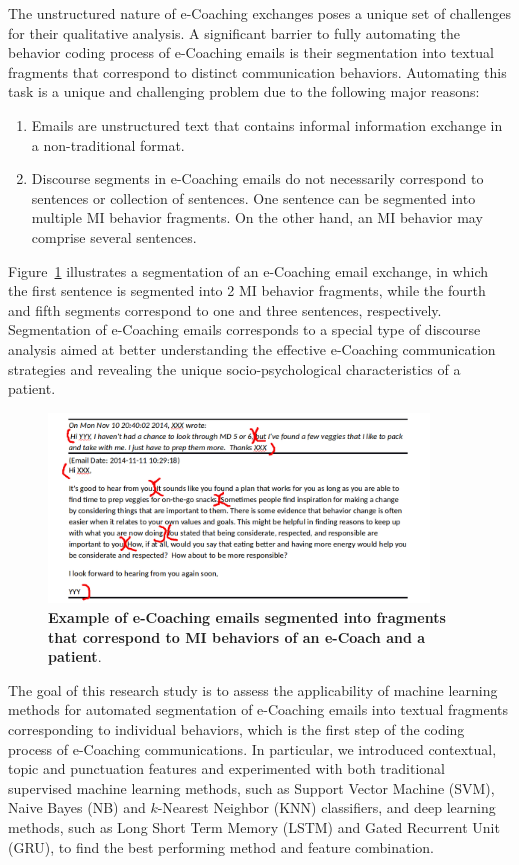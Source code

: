 \documentclass{amia}
\begin{document}
The unstructured nature of e-Coaching exchanges poses a unique set of challenges for their qualitative analysis. A significant barrier to fully automating the behavior coding process of e-Coaching emails is their segmentation into textual fragments that correspond to distinct communication behaviors. Automating this task is a unique and challenging problem due to the following major reasons:

\begin{enumerate}
\item Emails are unstructured text that contains informal information exchange in a non-traditional format.
\item Discourse segments in e-Coaching emails do not necessarily correspond to sentences or collection of sentences. One sentence can be segmented into multiple MI behavior fragments. On the other hand, an MI behavior may comprise several sentences.
\end{enumerate}

Figure~\ref{fig:text-segment} illustrates a segmentation of an e-Coaching email exchange, in which the first sentence is segmented into 2 MI behavior fragments, while the fourth and fifth segments correspond to one and three sentences, respectively. Segmentation of e-Coaching emails corresponds to a special type of discourse analysis \cite{webber2012discourse} aimed at better understanding the effective e-Coaching communication strategies and revealing the unique socio-psychological characteristics of a patient.

\begin{figure}[!htb]
    \centering
    \includegraphics[width=0.9\textwidth]{figures/segment-example.png}
    \caption{\textbf{Example of e-Coaching emails segmented into fragments that correspond to MI behaviors of an e-Coach and a patient}.}
    \label{fig:text-segment}
\end{figure}

The goal of this research study is to assess the applicability of machine learning methods for automated segmentation of e-Coaching emails into textual fragments corresponding to individual behaviors, which is the first step of the coding process of e-Coaching communications. In particular, we introduced contextual, topic and punctuation features and experimented with both traditional supervised machine learning methods, such as Support Vector Machine (SVM), Naive Bayes (NB) and $k$-Nearest Neighbor (KNN) classifiers, and deep learning methods, such as Long Short Term Memory (LSTM) and Gated Recurrent Unit (GRU), to find the best performing method and feature combination. 
\end{document}

